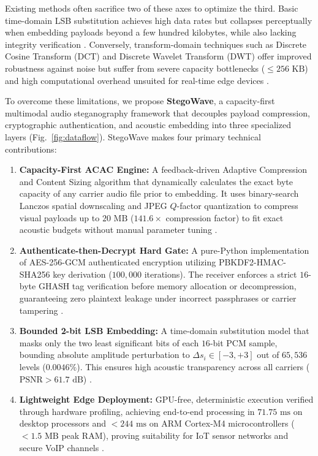 \documentclass[10pt,conference]{IEEEtran}
\begin{document}
Existing methods often sacrifice two of these axes to optimize the third. Basic time-domain LSB substitution achieves high data rates but collapses perceptually when embedding payloads beyond a few hundred kilobytes, while also lacking integrity verification \cite{aslantas2022,chen2023}. Conversely, transform-domain techniques such as Discrete Cosine Transform (DCT) and Discrete Wavelet Transform (DWT) offer improved robustness against noise but suffer from severe capacity bottlenecks ($\le 256\text{ KB}$) and high computational overhead unsuited for real-time edge devices \cite{patel2022,kumar2023,martinez2023}.

To overcome these limitations, we propose \textbf{StegoWave}, a capacity-first multimodal audio steganography framework that decouples payload compression, cryptographic authentication, and acoustic embedding into three specialized layers (Fig.~\ref{fig:dataflow}). StegoWave makes four primary technical contributions:
\begin{enumerate}
    \item \textbf{Capacity-First ACAC Engine:} A feedback-driven Adaptive Compression and Content Sizing algorithm that dynamically calculates the exact byte capacity of any carrier audio file prior to embedding. It uses binary-search Lanczos spatial downscaling and JPEG $Q$-factor quantization to compress visual payloads up to $20\text{ MB}$ ($141.6\times$ compression factor) to fit exact acoustic budgets without manual parameter tuning \cite{gupta2023,tanaka2023}.
    \item \textbf{Authenticate-then-Decrypt Hard Gate:} A pure-Python implementation of AES-256-GCM authenticated encryption utilizing PBKDF2-HMAC-SHA256 key derivation ($100,000$ iterations). The receiver enforces a strict $16$-byte GHASH tag verification before memory allocation or decompression, guaranteeing zero plaintext leakage under incorrect passphrases or carrier tampering \cite{wu2023,ibrahim2024,choi2024}.
    \item \textbf{Bounded 2-bit LSB Embedding:} A time-domain substitution model that masks only the two least significant bits of each $16$-bit PCM sample, bounding absolute amplitude perturbation to $\Delta s_i \in [-3, +3]$ out of $65,536$ levels ($0.0046\%$). This ensures high acoustic transparency across all carriers ($\text{PSNR} > 61.7\text{ dB}$) \cite{aslantas2022,chen2023,brigham1988}.
    \item \textbf{Lightweight Edge Deployment:} GPU-free, deterministic execution verified through hardware profiling, achieving end-to-end processing in $71.75\text{ ms}$ on desktop processors and $<244\text{ ms}$ on ARM Cortex-M4 microcontrollers ($<1.5\text{ MB}$ peak RAM), proving suitability for IoT sensor networks and secure VoIP channels \cite{wu2023,hmood2024}.
\end{enumerate}
\end{document}
